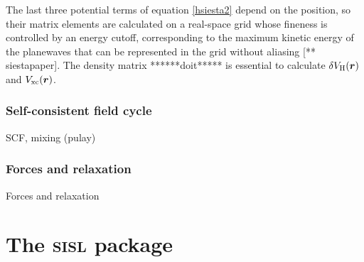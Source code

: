 The last three potential terms of equation \ref{hsiesta2} depend on the position, so their matrix elements are calculated on a real-space grid whose fineness is controlled by an energy cutoff, corresponding to the maximum kinetic energy of the planewaves that can be represented in the grid without aliasing [** siestapaper]. The density matrix ******doit***** is essential to calculate \(\delta V_{\mathrm{H}}(\bm r)\) and \(V_{\mathrm{xc}}(\bm{r})\).



\subsubsection*{Self-consistent field cycle}
SCF, mixing (pulay)

\subsubsection{Forces and relaxation}
Forces and relaxation


%
%
%
%
%
%
%
\section{The \textsc{sisl} package}



